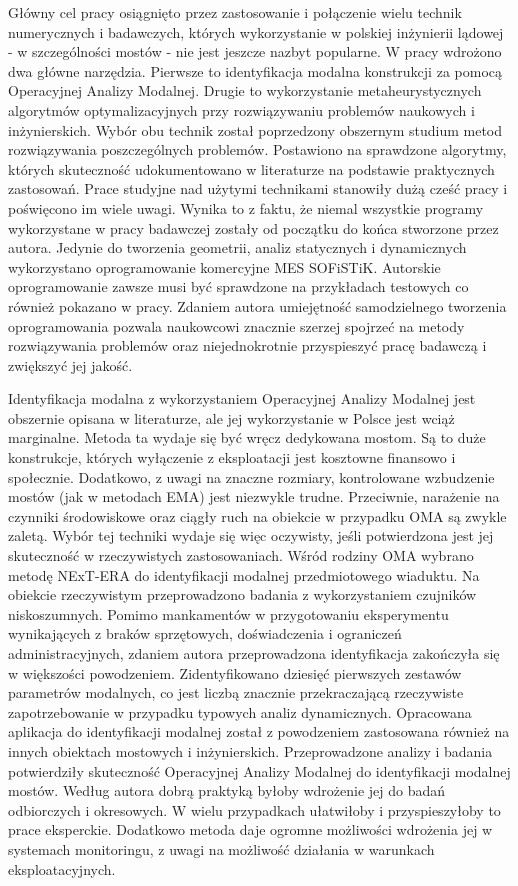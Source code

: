 Główny cel pracy osiągnięto przez zastosowanie i połączenie wielu technik numerycznych i badawczych, których wykorzystanie w polskiej inżynierii lądowej - w szczególności mostów - nie jest jeszcze nazbyt popularne. W pracy wdrożono dwa główne narzędzia. Pierwsze to identyfikacja modalna konstrukcji za pomocą Operacyjnej Analizy Modalnej. Drugie to wykorzystanie metaheurystycznych algorytmów optymalizacyjnych przy rozwiązywaniu problemów naukowych i inżynierskich. Wybór obu technik został poprzedzony obszernym studium metod rozwiązywania poszczególnych problemów. Postawiono na sprawdzone algorytmy, których skuteczność udokumentowano w literaturze na podstawie praktycznych zastosowań. Prace studyjne nad użytymi technikami stanowiły dużą cześć pracy i poświęcono im wiele uwagi. Wynika to z faktu, że niemal wszystkie programy wykorzystane w pracy badawczej zostały od początku do końca stworzone przez autora. Jedynie do tworzenia geometrii, analiz statycznych i dynamicznych wykorzystano oprogramowanie komercyjne MES SOFiSTiK. Autorskie oprogramowanie zawsze musi być sprawdzone na przykładach testowych co również pokazano w pracy. Zdaniem autora umiejętność samodzielnego tworzenia oprogramowania pozwala naukowcowi znacznie szerzej spojrzeć na metody rozwiązywania problemów oraz niejednokrotnie przyspieszyć pracę badawczą i zwiększyć jej jakość.

Identyfikacja modalna z wykorzystaniem Operacyjnej Analizy Modalnej jest obszernie opisana w literaturze, ale jej wykorzystanie w Polsce jest wciąż marginalne. Metoda ta wydaje się być wręcz dedykowana mostom. Są to duże konstrukcje, których wyłączenie z eksploatacji jest kosztowne finansowo i społecznie. Dodatkowo, z uwagi na znaczne rozmiary, kontrolowane wzbudzenie mostów (jak w metodach EMA) jest niezwykle trudne. Przeciwnie, narażenie na czynniki środowiskowe oraz ciągły ruch na obiekcie w przypadku OMA są zwykle zaletą. Wybór tej techniki wydaje się więc oczywisty, jeśli potwierdzona jest jej skuteczność w rzeczywistych zastosowaniach. Wśród rodziny OMA wybrano metodę NExT-ERA do identyfikacji modalnej przedmiotowego wiaduktu. Na obiekcie rzeczywistym przeprowadzono badania z wykorzystaniem czujników niskoszumnych. Pomimo mankamentów w przygotowaniu eksperymentu wynikających z braków sprzętowych, doświadczenia i ograniczeń administracyjnych, zdaniem autora przeprowadzona identyfikacja zakończyła się w większości powodzeniem. Zidentyfikowano dziesięć pierwszych zestawów parametrów modalnych, co jest liczbą znacznie przekraczającą rzeczywiste zapotrzebowanie w przypadku typowych analiz dynamicznych. Opracowana aplikacja do identyfikacji modalnej został z powodzeniem zastosowana również na innych obiektach mostowych i inżynierskich. Przeprowadzone analizy i badania potwierdziły skuteczność Operacyjnej Analizy Modalnej do identyfikacji modalnej mostów. Według autora dobrą praktyką byłoby wdrożenie jej do badań odbiorczych i okresowych. W wielu przypadkach ułatwiłoby i przyspieszyłoby to prace eksperckie. Dodatkowo metoda daje ogromne możliwości wdrożenia jej w systemach monitoringu, z uwagi na możliwość działania w warunkach eksploatacyjnych.

